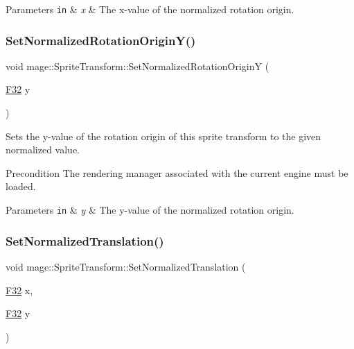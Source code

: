 \begin{DoxyParams}[1]{Parameters}
\mbox{\tt in}  & {\em x} & The x-\/value of the normalized rotation origin. \\
\hline
\end{DoxyParams}
\hypertarget{structmage_1_1_sprite_transform_ab940629ca5a67e28fa470800bcef705d}{}\label{structmage_1_1_sprite_transform_ab940629ca5a67e28fa470800bcef705d} 
\subsubsection{\texorpdfstring{Set\+Normalized\+Rotation\+Origin\+Y()}{SetNormalizedRotationOriginY()}}
{\footnotesize\ttfamily void mage\+::\+Sprite\+Transform\+::\+Set\+Normalized\+Rotation\+OriginY (\begin{DoxyParamCaption}\item[{\hyperlink{namespacemage_aa97e833b45f06d60a0a9c4fc22ae02c0}{F32}}]{y }\end{DoxyParamCaption})}

Sets the y-\/value of the rotation origin of this sprite transform to the given normalized value.

\begin{DoxyPrecond}{Precondition}
The rendering manager associated with the current engine must be loaded. 
\end{DoxyPrecond}

\begin{DoxyParams}[1]{Parameters}
\mbox{\tt in}  & {\em y} & The y-\/value of the normalized rotation origin. \\
\hline
\end{DoxyParams}
\hypertarget{structmage_1_1_sprite_transform_a954e7a562a7c68ef402881dc982529ba}{}\label{structmage_1_1_sprite_transform_a954e7a562a7c68ef402881dc982529ba} 
\subsubsection{\texorpdfstring{Set\+Normalized\+Translation()}{SetNormalizedTranslation()}\hspace{0.1cm}{\footnotesize\ttfamily [1/3]}}
{\footnotesize\ttfamily void mage\+::\+Sprite\+Transform\+::\+Set\+Normalized\+Translation (\begin{DoxyParamCaption}\item[{\hyperlink{namespacemage_aa97e833b45f06d60a0a9c4fc22ae02c0}{F32}}]{x,  }\item[{\hyperlink{namespacemage_aa97e833b45f06d60a0a9c4fc22ae02c0}{F32}}]{y }\end{DoxyParamCaption})}

